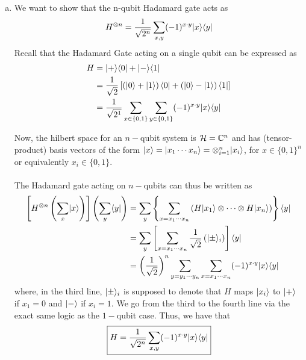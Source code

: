 \documentclass[11pt]{article}
\begin{document}
\begin{enumerate}[(a).]
  \item We want to show that the n-qubit Hadamard gate acts as $$ H^{\otimes n} = \frac{1}{\sqrt{2^n}} \sum_{x, y} (-1)^{x \cdot y} \lvert x\rangle \langle y\rvert $$ Recall that the Hadamard Gate acting on a single qubit can be expressed as 
  \begin{align*}
    H &= \lvert+\rangle\langle0\rvert + \lvert-\rangle\langle1\rvert \\
    &= \frac{1}{\sqrt{2}} \left[ \left(\lvert0\rangle + \lvert1\rangle\right) \langle0\rvert + \left( \lvert0\rangle - \lvert1\rangle \right) \langle1\rvert \right] \\
    &= \frac{1}{\sqrt{2^1}} \sum_{x \in \{0, 1\}} \sum_{y \in \{0, 1\}} (-1)^{x \cdot y} \lvert x\rangle \langle y\rvert
  \end{align*}

  Now, the hilbert space for an $n-$qubit system is $\mathcal{H} = \mathbb{C}^n$ and has (tensor-product) basis vectors of the form  $\lvert x\rangle = \lvert x_1 \cdots x_n\rangle = \otimes_{i = 1}^{n} \lvert x_i\rangle$, for $x \in \{0, 1\}^n$ or equivalently $x_i \in \{0, 1\}$. \\
  \\
  The Hadamard gate acting on $n-$qubits can thus be written as 
  \begin{align*}
    \left[H^{\otimes n}\left(\sum_{x} \lvert x\rangle\right)\right] \left(\sum_{y} \langle y\rvert\right) &= \sum_y \left\{\sum_{x = x_1\cdots x_n}  \left(H\lvert x_1\rangle  \otimes \cdots \otimes  H \lvert x_n\rangle\right)\right\} \langle y\rvert \\
    &= \sum_{y} \left[\sum_{x = x_1\cdots x_n} \frac{1}{\sqrt{2}}\left(\lvert\pm\rangle_i \right)  \right]\langle y\rvert \\
    &= \left(\frac{1}{\sqrt{2}}\right)^n \sum_{y = y_1 \cdots y_n} \sum_{x = x_1 \cdots x_n} (-1)^{x \cdot y} \lvert x\rangle \langle y\rvert
  \end{align*} where, in the third line, $\lvert\pm\rangle_i$ is supposed to denote that $H$ maps $\lvert x_i\rangle$ to $\lvert+\rangle$ if $x_1 = 0$ and $\lvert-\rangle$ if $x_i = 1$. We go from the third to the fourth line via the exact same logic as the $1-$qubit case. Thus, we have that 
  \begin{align*}
    \boxed{H = \frac{1}{\sqrt{2^n}} \sum_{x, y} (-1)^{x \cdot y} \lvert x\rangle\langle y\rvert}
  \end{align*}
  \vskip 1cm 


\end{enumerate}
\end{document}
